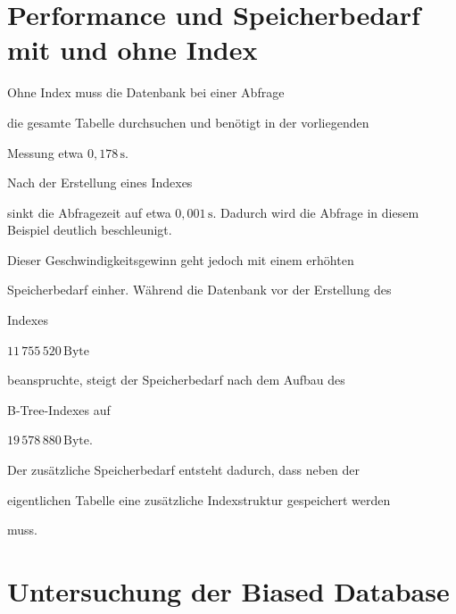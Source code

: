 \documentclass{article}
\begin{document}
\section{Performance und Speicherbedarf mit und ohne Index}

Ohne Index muss die Datenbank bei einer Abfrage

die gesamte Tabelle durchsuchen und benötigt in der vorliegenden

Messung etwa $0{,}178\,\mathrm{s}$.

%


Nach der Erstellung eines Indexes

sinkt die Abfragezeit auf etwa $0{,}001\,\mathrm{s}$.
Dadurch wird die Abfrage in diesem Beispiel deutlich beschleunigt.



Dieser Geschwindigkeitsgewinn geht jedoch mit einem erhöhten

Speicherbedarf einher. Während die Datenbank vor der Erstellung des

Indexes

$11\,755\,520\,\mathrm{Byte}$

beanspruchte, steigt der Speicherbedarf nach dem Aufbau des

B-Tree-Indexes auf

$19\,578\,880\,\mathrm{Byte}$.

%
%


Der zusätzliche Speicherbedarf entsteht dadurch, dass neben der

eigentlichen Tabelle eine zusätzliche Indexstruktur gespeichert werden

muss.



\section{Untersuchung der Biased Database}
\end{document}
